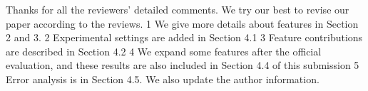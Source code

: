 Thanks for all the reviewers' detailed comments. We try our best to revise our paper according to the reviews. 1 We give more details about features in Section 2 and 3. 2 Experimental settings are added in Section 4.1 3 Feature contributions are described in Section 4.2 4 We expand some features after the official evaluation, and these results are also included in Section 4.4 of this submission 5 Error analysis is in Section 4.5. We also update the author information.
